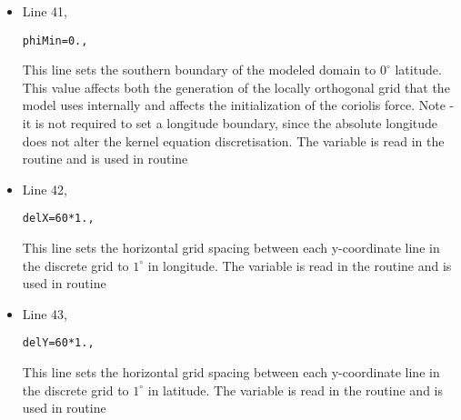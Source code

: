 \begin{itemize}

\item Line 41,
\begin{verbatim}
phiMin=0.,
\end{verbatim}
  This line sets the southern boundary of the modeled domain to
  $0^{\circ}$ latitude. This value affects both the generation of the
  locally orthogonal grid that the model uses internally and affects
  the initialization of the coriolis force.  Note - it is not required
  to set a longitude boundary, since the absolute longitude does not
  alter the kernel equation discretisation.  The variable
   is read in the
  routine  and is used in routine


\item Line 42,
\begin{verbatim}
delX=60*1.,
\end{verbatim}
  This line sets the horizontal grid spacing between each y-coordinate
  line in the discrete grid to $1^{\circ}$ in longitude.  The variable
   is read in the routine
   and is used in routine
 

\item Line 43,
\begin{verbatim}
delY=60*1.,
\end{verbatim}
  This line sets the horizontal grid spacing between each y-coordinate
  line in the discrete grid to $1^{\circ}$ in latitude.  The variable
   is read in the routine
   and is used in routine


\end{itemize}
